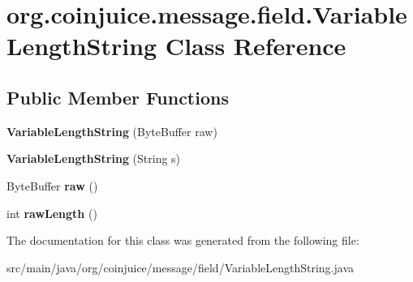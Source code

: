 \hypertarget{classorg_1_1coinjuice_1_1message_1_1field_1_1_variable_length_string}{\section{org.\-coinjuice.\-message.\-field.\-Variable\-Length\-String Class Reference}
\label{classorg_1_1coinjuice_1_1message_1_1field_1_1_variable_length_string}
}
\subsection*{Public Member Functions}
\begin{DoxyCompactItemize}
\item 
\hypertarget{classorg_1_1coinjuice_1_1message_1_1field_1_1_variable_length_string_a724b5c0a13d0857ec7bb131bf3a769d4}{{\bfseries Variable\-Length\-String} (Byte\-Buffer raw)}\label{classorg_1_1coinjuice_1_1message_1_1field_1_1_variable_length_string_a724b5c0a13d0857ec7bb131bf3a769d4}

\item 
\hypertarget{classorg_1_1coinjuice_1_1message_1_1field_1_1_variable_length_string_a00f66be4af519050bc5841bdf95c10f0}{{\bfseries Variable\-Length\-String} (String s)}\label{classorg_1_1coinjuice_1_1message_1_1field_1_1_variable_length_string_a00f66be4af519050bc5841bdf95c10f0}

\item 
\hypertarget{classorg_1_1coinjuice_1_1message_1_1field_1_1_variable_length_string_ac1b8bf58d2393a53760eefa9a8072d46}{Byte\-Buffer {\bfseries raw} ()}\label{classorg_1_1coinjuice_1_1message_1_1field_1_1_variable_length_string_ac1b8bf58d2393a53760eefa9a8072d46}

\item 
\hypertarget{classorg_1_1coinjuice_1_1message_1_1field_1_1_variable_length_string_a9f50c8e9bbc80396ad439df5ce1f04f7}{int {\bfseries raw\-Length} ()}\label{classorg_1_1coinjuice_1_1message_1_1field_1_1_variable_length_string_a9f50c8e9bbc80396ad439df5ce1f04f7}

\end{DoxyCompactItemize}


The documentation for this class was generated from the following file\-:\begin{DoxyCompactItemize}
\item 
src/main/java/org/coinjuice/message/field/Variable\-Length\-String.\-java\end{DoxyCompactItemize}
